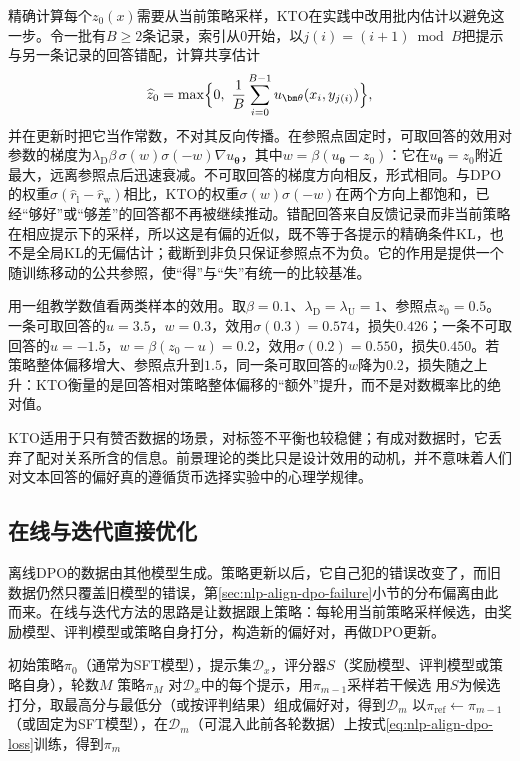精确计算每个$z_0(x)$需要从当前策略采样，KTO在实践中改用批内估计以避免这一步。令一批有$B\ge2$条记录，索引从0开始，以$j(i)=(i+1)\bmod B$把提示与另一条记录的回答错配，计算共享估计
\begin{equation}
 \widehat z_0=\max\Bigl\{0,\ \frac1B\sum_{i=0}^{B-1}u_{\bm\theta}(x_i,y_{j(i)})\Bigr\},
 \label{eq:nlp-align-kto-reference-estimate}
\end{equation}
并在更新时把它当作常数，不对其反向传播。在参照点固定时，可取回答的效用对参数的梯度为$\lambda_{\mathrm D}\beta\,\sigma(w)\sigma(-w)\nabla u_{\bm\theta}$，其中$w=\beta(u_{\bm\theta}-z_0)$：它在$u_{\bm\theta}=z_0$附近最大，远离参照点后迅速衰减。不可取回答的梯度方向相反，形式相同。与DPO的权重$\sigma(\hat r_{\mathrm l}-\hat r_{\mathrm w})$相比，KTO的权重$\sigma(w)\sigma(-w)$在两个方向上都饱和，已经“够好”或“够差”的回答都不再被继续推动。错配回答来自反馈记录而非当前策略在相应提示下的采样，所以这是有偏的近似，既不等于各提示的精确条件KL，也不是全局KL的无偏估计；截断到非负只保证参照点不为负。它的作用是提供一个随训练移动的公共参照，使“得”与“失”有统一的比较基准。

用一组教学数值看两类样本的效用。取$\beta=0.1$、$\lambda_{\mathrm D}=\lambda_{\mathrm U}=1$、参照点$z_0=0.5$。一条可取回答的$u=3.5$，$w=0.3$，效用$\sigma(0.3)=0.574$，损失$0.426$；一条不可取回答的$u=-1.5$，$w=\beta(z_0-u)=0.2$，效用$\sigma(0.2)=0.550$，损失$0.450$。若策略整体偏移增大、参照点升到$1.5$，同一条可取回答的$w$降为$0.2$，损失随之上升：KTO衡量的是回答相对策略整体偏移的“额外”提升，而不是对数概率比的绝对值。

KTO适用于只有赞否数据的场景，对标签不平衡也较稳健；有成对数据时，它丢弃了配对关系所含的信息。前景理论的类比只是设计效用的动机，并不意味着人们对文本回答的偏好真的遵循货币选择实验中的心理学规律。

\subsection{在线与迭代直接优化}
\label{sec:nlp-align-refresh}

离线DPO的数据由其他模型生成。策略更新以后，它自己犯的错误改变了，而旧数据仍然只覆盖旧模型的错误，第\ref{sec:nlp-align-dpo-failure}小节的分布偏离由此而来。在线与迭代方法的思路是让数据跟上策略：每轮用当前策略采样候选，由奖励模型、评判模型或策略自身打分，构造新的偏好对，再做DPO更新。

\begin{algorithm}[迭代直接偏好优化]
  \label{alg:nlp-align-iterative-dpo}
  \begin{algorithmic}[1]
    \Require 初始策略$\pi_0$（通常为SFT模型），提示集$\mathcal D_x$，评分器$S$（奖励模型、评判模型或策略自身），轮数$M$
    \Ensure 策略$\pi_M$
      \State 对$\mathcal D_x$中的每个提示，用$\pi_{m-1}$采样若干候选
      \State 用$S$为候选打分，取最高分与最低分（或按评判结果）组成偏好对，得到$\mathcal D_m$
      \State 以$\pi_{\mathrm{ref}}\gets\pi_{m-1}$（或固定为SFT模型），在$\mathcal D_m$（可混入此前各轮数据）上按式\eqref{eq:nlp-align-dpo-loss}训练，得到$\pi_m$
    \EndFor
  \end{algorithmic}
\end{algorithm}

